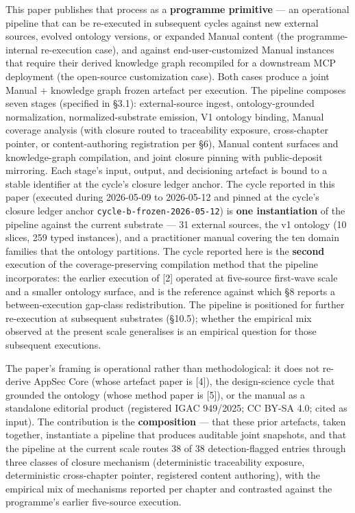 \documentclass[
]{article}
\begin{document}
This paper publishes that process as a \textbf{programme primitive} ---
an operational pipeline that can be re-executed in subsequent cycles
against new external sources, evolved ontology versions, or expanded
Manual content (the programme-internal re-execution case), and against
end-user-customized Manual instances that require their derived
knowledge graph recompiled for a downstream MCP deployment (the
open-source customization case). Both cases produce a joint Manual +
knowledge graph frozen artefact per execution. The pipeline composes
seven stages (specified in §3.1): external-source ingest,
ontology-grounded normalization, normalized-substrate emission, V1
ontology binding, Manual coverage analysis (with closure routed to
traceability exposure, cross-chapter pointer, or content-authoring
registration per §6), Manual content surfaces and knowledge-graph
compilation, and joint closure pinning with public-deposit mirroring.
Each stage's input, output, and decisioning artefact is bound to a
stable identifier at the cycle's closure ledger anchor. The cycle
reported in this paper (executed during 2026-05-09 to 2026-05-12 and
pinned at the cycle's closure ledger anchor
\texttt{cycle-b-frozen-2026-05-12}) is \textbf{one instantiation} of the
pipeline against the current substrate --- 31 external sources, the v1
ontology (10 slices, 259 typed instances), and a practitioner manual
covering the ten domain families that the ontology partitions. The cycle
reported here is the \textbf{second} execution of the
coverage-preserving compilation method that the pipeline incorporates:
the earlier execution of {[}2{]} operated at five-source first-wave
scale and a smaller ontology surface, and is the reference against which
§8 reports a between-execution gap-class redistribution. The pipeline is
positioned for further re-execution at subsequent substrates (§10.5);
whether the empirical mix observed at the present scale generalises is
an empirical question for those subsequent executions.

The paper's framing is operational rather than methodological: it does
not re-derive AppSec Core (whose artefact paper is {[}4{]}), the
design-science cycle that grounded the ontology (whose method paper is
{[}5{]}), or the manual as a standalone editorial product (registered
IGAC 949/2025; CC BY-SA 4.0; cited as input). The contribution is the
\textbf{composition} --- that these prior artefacts, taken together,
instantiate a pipeline that produces auditable joint snapshots, and that
the pipeline at the current scale routes 38 of 38 detection-flagged
entries through three classes of closure mechanism (deterministic
traceability exposure, deterministic cross-chapter pointer, registered
content authoring), with the empirical mix of mechanisms reported per
chapter and contrasted against the programme's earlier five-source
execution.
\end{document}
